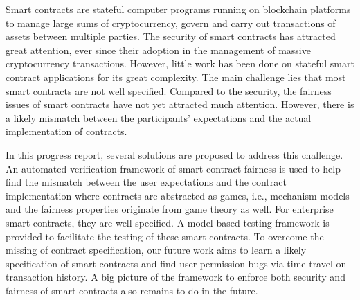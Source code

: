 \documentclass[12pt,a4paper]{Thesis} %
\begin{document}

Smart contracts are stateful computer programs running on blockchain platforms to manage large sums of
cryptocurrency, govern and carry out transactions of assets between multiple parties.
The security of smart contracts has attracted great attention, ever since their adoption in the management of massive cryptocurrency transactions.
However, little work has been done on stateful smart contract applications for its great complexity.
The main challenge lies that most smart contracts are not well specified.
Compared to the security, the fairness issues of smart contracts have not yet attracted much attention. 
However, there is a likely mismatch between the participants' expectations and the actual implementation of contracts.

In this progress report, several solutions are proposed to address this challenge.
An automated verification framework of smart contract fairness is used to help find the mismatch between the user expectations and the contract implementation where contracts are abstracted as games, i.e., mechanism models and the fairness properties originate from game theory as well.
For enterprise smart contracts, they are well specified.
A model-based testing framework is provided to facilitate the testing of these smart contracts.
To overcome the missing of contract specification, our future work aims to learn a likely specification of smart contracts and find user permission bugs via time travel on transaction history. 
A big picture of the framework to enforce both security and fairness of smart contracts also remains to do in the future.


\tableofcontents %

\listoffigures %

\listoftables %


\end{document}
